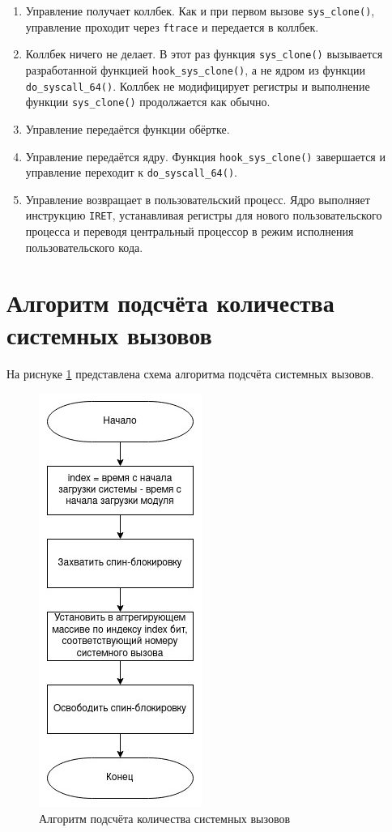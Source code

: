 \begin{enumerate}
	\item Управление получает коллбек. Как и при первом вызове \texttt{sys\_clone()}, управление проходит через \texttt{ftrace} и передается в коллбек.
	
	\item Коллбек ничего не делает. В этот раз функция \texttt{sys\_clone()} вызывается разработанной функцией \texttt{hook\_sys\_clone()}, а не ядром из функции \texttt{do\_syscall\_64()}. Коллбек не модифицирует регистры и выполнение функции \texttt{sys\_clone()} продолжается как обычно.
	
	\item Управление передаётся функции обёртке.
	
	\item Управление передаётся ядру. Функция \texttt{hook\_sys\_clone()} завершается и управление переходит к \texttt{do\_syscall\_64()}.
	
	\item Управление возвращает в пользовательский процесс. Ядро выполняет инструкцию \texttt{IRET}, устанавливая регистры для нового пользовательского процесса и переводя центральный процессор в режим исполнения пользовательского кода.
\end{enumerate}

\section{Алгоритм подсчёта количества системных вызовов}

На риснуке \ref{fig:ftrace_cnt_algo} представлена схема алгоритма подсчёта системных вызовов.

\begin{figure}[h]
	\begin{center}
		\includegraphics[scale=0.6]{img/ftrace_cnt_algo.jpg}
	\end{center}
	\caption{Алгоритм подсчёта количества системных вызовов}
	\label{fig:ftrace_cnt_algo}
\end{figure}

